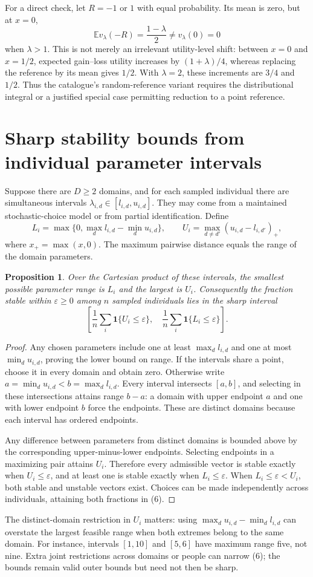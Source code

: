 \documentclass[11pt]{article}
\newtheorem{proposition}{Proposition}
\newcommand{\E}{\mathbb E}
\begin{document}
For a direct check, let $R=-1$ or $1$ with equal probability. Its mean is zero, but at $x=0$,
\[
 \E v_\lambda(-R)=\frac{1-\lambda}{2}\ne v_\lambda(0)=0
\]
when $\lambda>1$. This is not merely an irrelevant utility-level shift: between $x=0$ and $x=1/2$, expected gain--loss utility increases by $(1+\lambda)/4$, whereas replacing the reference by its mean gives $1/2$. With $\lambda=2$, these increments are $3/4$ and $1/2$. Thus the catalogue's random-reference variant requires the distributional integral or a justified special case permitting reduction to a point reference.

\section*{Sharp stability bounds from individual parameter intervals}
Suppose there are $D\geq2$ domains, and for each sampled individual there are simultaneous intervals
$\lambda_{i,d}\in[l_{i,d},u_{i,d}]$. They may come from a maintained stochastic-choice model or from partial identification. Define
\[
 L_i=\max\{0,\max_d l_{i,d}-\min_d u_{i,d}\},\qquad
 U_i=\max_{d\ne d'}(u_{i,d}-l_{i,d'})_+,
\]
where $x_+=\max(x,0)$. The maximum pairwise distance equals the range of the domain parameters.
\begin{proposition}
Over the Cartesian product of these intervals, the smallest possible parameter range is $L_i$ and the largest is $U_i$. Consequently the fraction stable within $\varepsilon\geq0$ among $n$ sampled individuals lies in the sharp interval
\[
 \left[\frac1n\sum_i\mathbf1\{U_i\leq\varepsilon\},\quad
       \frac1n\sum_i\mathbf1\{L_i\leq\varepsilon\}\right].     \tag{6}
\]
\end{proposition}
\begin{proof}
Any chosen parameters include one at least $\max_d l_{i,d}$ and one at most $\min_d u_{i,d}$, proving the lower bound on range. If the intervals share a point, choose it in every domain and obtain zero. Otherwise write $a=\min_d u_{i,d}<b=\max_d l_{i,d}$. Every interval intersects $[a,b]$, and selecting in these intersections attains range $b-a$: a domain with upper endpoint $a$ and one with lower endpoint $b$ force the endpoints. These are distinct domains because each interval has ordered endpoints.

Any difference between parameters from distinct domains is bounded above by the corresponding upper-minus-lower endpoints. Selecting endpoints in a maximizing pair attains $U_i$. Therefore every admissible vector is stable exactly when $U_i\leq\varepsilon$, and at least one is stable exactly when $L_i\leq\varepsilon$. When $L_i\leq\varepsilon<U_i$, both stable and unstable vectors exist. Choices can be made independently across individuals, attaining both fractions in (6).
\end{proof}
The distinct-domain restriction in $U_i$ matters: using $\max_d u_{i,d}-\min_d l_{i,d}$ can overstate the largest feasible range when both extremes belong to the same domain. For instance, intervals $[1,10]$ and $[5,6]$ have maximum range five, not nine. Extra joint restrictions across domains or people can narrow (6); the bounds remain valid outer bounds but need not then be sharp.
\end{document}

